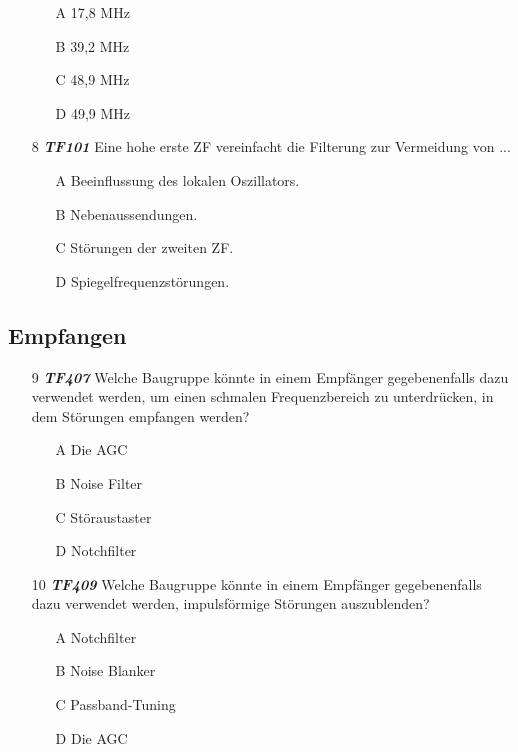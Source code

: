\begin{enumerate}
	\begin{enumerate}
	\itemsep1pt\parskip0pt
		\item[A] 17,8 MHz 
		\item[B] 39,2 MHz
		\item[C] 48,9 MHz 
		\item[D] 49,9 MHz
	\end{enumerate} 
	\item[8] \emph{\textbf{TF101}} Eine hohe erste ZF vereinfacht die Filterung zur Vermeidung von ...
	\begin{enumerate}
	\itemsep1pt\parskip0pt
		\item[A] Beeinflussung des lokalen Oszillators.
		\item[B] Nebenaussendungen.
		\item[C] Störungen der zweiten ZF.
		\item[D] Spiegelfrequenzstörungen.
	\end{enumerate} 
\end{enumerate}

\subsection*{Empfangen}

\begin{enumerate} 
	\item[9] \emph{\textbf{TF407}} Welche Baugruppe könnte in einem Empfänger gegebenenfalls dazu verwendet werden, um einen schmalen Frequenzbereich zu unterdrücken, in dem Störungen empfangen werden?
	\begin{enumerate}
	\itemsep1pt\parskip0pt
		\item[A] Die AGC 
		\item[B] Noise Filter
		\item[C] Störaustaster 
		\item[D] Notchfilter
	\end{enumerate} 
	\item[10] \emph{\textbf{TF409}}  Welche Baugruppe könnte in einem Empfänger gegebenenfalls dazu verwendet werden, impulsförmige Störungen auszublenden?
	\begin{enumerate}
	\itemsep1pt\parskip0pt
		\item[A] Notchfilter 
		\item[B] Noise Blanker
		\item[C] Passband-Tuning 
		\item[D] Die AGC
	\end{enumerate} 
\end{enumerate}

